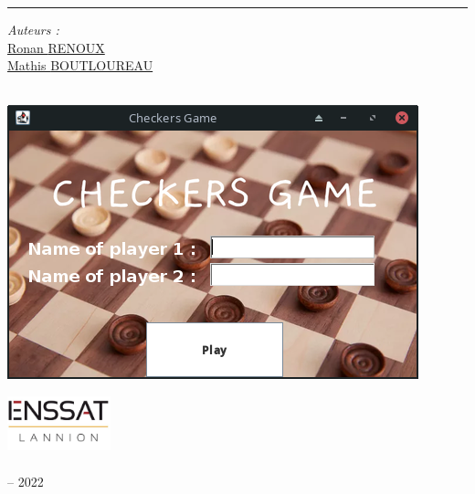 \begin{titlepage}
  \doublespacing
  \large
  \hfill
  \vspace{1cm}
  \begin{center}
    \doublespacing
    \textcolor{Maroon}{\huge{\myTitle}}
  \end{center}
  \vspace{1.25cm}
  \hrule
  \vspace{1.5cm}
  \onehalfspacing
  \begin{center}

    \begin{minipage}[t]{0.5\textwidth}
      \begin{flushleft}
        \emph{Auteurs :} \\
        \href{https://ronanren.github.io/}{Ronan \textsc{RENOUX}} \\
        \href{https://mboultoureau.com}{Mathis \textsc{BOUTLOUREAU}} \\
      \end{flushleft}
    \end{minipage}
    \begin{minipage}[t]{0.4\textwidth}
      \begin{flushright}
        
      \end{flushright}
    \end{minipage}\\[1.5cm]

    \hspace*{-0.5cm}
    \includegraphics[width=0.8\columnwidth]{figures/mainMenu.png}
    \hfill
    \vfill

    \includegraphics[width=3cm]{figures/ENSSAT_Logo}\\
    \href{https://www.enssat.fr/}{\mySchool}\\
    {\myDepartment} -- 2022\\
    \href{https://www.univ-rennes1.fr/}{\myUni}
  \end{center}
\end{titlepage}
